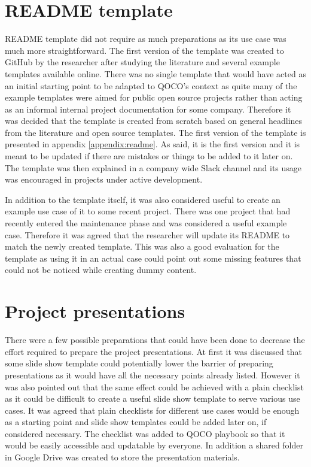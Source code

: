 \section{README template}

README template did not require as much preparations as its use case was much more straightforward. The first version of the template was created to GitHub by the researcher
after studying the literature and several example templates available online. There was no single template that would have acted as an initial starting point to be adapted to
QOCO's context as quite many of the example templates were aimed for public open source projects rather than acting as an informal internal project documentation for some
company. Therefore it was decided that the template is created from scratch based on general headlines from the literature and open source templates. The first version
of the template is presented in appendix \ref{appendix:readme}. As said, it is the first version and it is meant to be updated if there are mistakes or things to be added to it
later on. The template was then explained in a company wide Slack channel and its usage was encouraged in projects under active development.

In addition to the template itself, it was also considered useful to create an example use case of it to some recent project. There was one project that had recently entered
the maintenance phase and was considered a useful example case. Therefore it was agreed that the researcher will update its README to match the newly created template.
This was also a good evaluation for the template as using it in an actual case could point out some missing features that could not be noticed while creating dummy content.

\section{Project presentations}

There were a few possible preparations that could have been done to decrease the effort required to prepare the project presentations. At first it was discussed that some
slide show template could potentially lower the barrier of preparing presentations as it would have all the necessary points already listed. However it was also pointed out
that the same effect could be achieved with a plain checklist as it could be difficult to create a useful slide show template to serve various use cases. It was agreed
that plain checklists for different use cases would be enough as a starting point and slide show templates could be added later on, if considered necessary. The checklist
was added to QOCO playbook so that it would be easily accessible and updatable by everyone. In addition a shared folder in Google Drive was created to store the presentation
materials.

